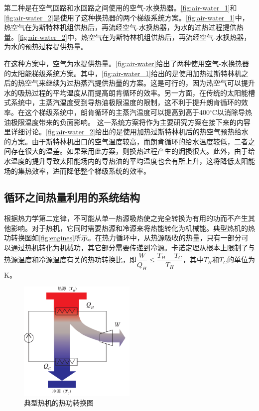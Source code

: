 第二种是在空气回路和水回路之间使用的空气-水换热器。\autoref{fig:air-water_1}和\autoref{fig:air-water_2}是使用了这种换热器的两个梯级系统方案。\autoref{fig:air-water_1}中，热空气在为斯特林机组供热后，再流经空气-水换热器，为水的过热过程提供热量。\autoref{fig:air-water_2}中，热空气在为斯特林机组供热后，再流经空气-水换热器，为水的预热过程提供热量。

在这种方案中，空气为水提供热量。\autoref{fig:air-water}给出了两种使用空气-水换热器的太阳能梯级系统方案。其中，\autoref{fig:air-water_1}给出的是使用加热过斯特林机之后的热空气来继续为过热蒸汽提供热量的方案。这是可行的，因为热空气可以提升水的吸热过程的平均温度从而提高朗肯循环的效率。另一方面，在传统的太阳能槽式系统中，主蒸汽温度受到导热油极限温度的限制，这不利于提升朗肯循环的效率。在这个梯级系统中，朗肯循环的主蒸汽温度可以提高到高于400$\mathrm{^\circ C}$以消除导热油极限温度带来的负面影响。
这一系统方案将作为主要研究方案在接下来的内容里详细讨论。\autoref{fig:air-water_2}给出的是使用加热过斯特林机后的热空气预热给水的方案。由于斯特林机出口的空气温度较高，而朗肯循环的给水温度较低，二者之间存在很大的温差。如果采用此方案，则换热过程产生的㶲损很大。此外，由于给水温度的提升导致太阳能场内的导热油的平均温度也会有所上升，这将降低太阳能场的集热效率，进而降低整个梯级系统的效率。

\subsection{循环之间热量利用的系统结构}
\label{sec:HRBC}

根据热力学第二定律，不可能从单一热源吸热使之完全转换为有用的功而不产生其他影响。对于热机，它同时需要热源和冷源来将热能转化为机械能。典型热机的热功转换图如\autoref{fig:engines}所示。在热力循环中，从热源吸收的热量，只有一部分可以通过热机转化为机械功，其它部分需要传递到冷源。卡诺定理从根本上限制了与热源温度和冷源温度有关的热功转换比，即$\dfrac{W}{Q_H} \leqslant \dfrac{T_H - T_C}{T_H}$，其中$T_H$和$T_C$的单位为$\mathrm{K}$。
\begin{figure}[htb]
\centering 
\includegraphics[width=0.5\textwidth]{fig/engines}
\caption{典型热机的热功转换图}
\label{fig:engines}
\end{figure}

